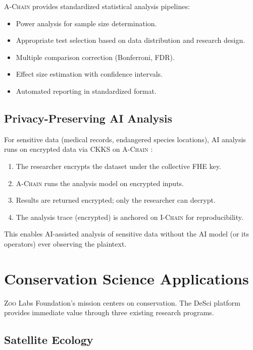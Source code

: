 \documentclass[11pt,letterpaper]{article}
\theoremstyle{definition}
\theoremstyle{remark}
\newcommand{\Zoo}{\textsc{Zoo}}
\newcommand{\AChain}{\textsc{A-Chain}}
\newcommand{\IChain}{\textsc{I-Chain}}
\newcommand{\CKKS}{\textsc{CKKS}}
\newcommand{\FHE}{\textsc{FHE}}
\begin{document}
\AChain{} provides standardized statistical analysis pipelines:

\begin{itemize}
    \item Power analysis for sample size determination.
    \item Appropriate test selection based on data distribution and research design.
    \item Multiple comparison correction (Bonferroni, FDR).
    \item Effect size estimation with confidence intervals.
    \item Automated reporting in standardized format.
\end{itemize}

\subsection{Privacy-Preserving AI Analysis}

For sensitive data (medical records, endangered species locations), AI analysis runs on encrypted data via \CKKS{} on \AChain{} \cite{zoo-fhe}:

\begin{enumerate}
    \item The researcher encrypts the dataset under the collective \FHE{} key.
    \item \AChain{} runs the analysis model on encrypted inputs.
    \item Results are returned encrypted; only the researcher can decrypt.
    \item The analysis trace (encrypted) is anchored on \IChain{} for reproducibility.
\end{enumerate}

This enables AI-assisted analysis of sensitive data without the AI model (or its operators) ever observing the plaintext.

\section{Conservation Science Applications}
\label{sec:conservation}

\Zoo{} Labs Foundation's mission centers on conservation. The DeSci platform provides immediate value through three existing research programs.

\subsection{Satellite Ecology}
\end{document}
